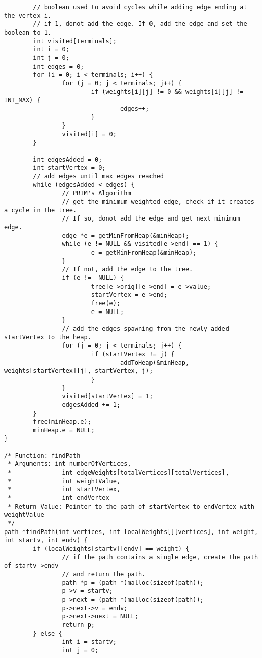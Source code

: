 \documentclass[a4paper]{article}
\begin{document}
\begin{lstlisting}
        // boolean used to avoid cycles while adding edge ending at the vertex i.
        // if 1, donot add the edge. If 0, add the edge and set the boolean to 1.
        int visited[terminals];
        int i = 0;
        int j = 0;
        int edges = 0;
        for (i = 0; i < terminals; i++) {
                for (j = 0; j < terminals; j++) {
                        if (weights[i][j] != 0 && weights[i][j] != INT_MAX) {
                                edges++;
                        }
                }
                visited[i] = 0;
        }

        int edgesAdded = 0;
        int startVertex = 0;
        // add edges until max edges reached
        while (edgesAdded < edges) {
                // PRIM's Algorithm
                // get the minimum weighted edge, check if it creates a cycle in the tree.
                // If so, donot add the edge and get next minimum edge.
                edge *e = getMinFromHeap(&minHeap);
                while (e != NULL && visited[e->end] == 1) {
                        e = getMinFromHeap(&minHeap);
                }
                // If not, add the edge to the tree.
                if (e !=  NULL) {
                        tree[e->orig][e->end] = e->value;
                        startVertex = e->end;
                        free(e);
                        e = NULL;
                }
                // add the edges spawning from the newly added startVertex to the heap.
                for (j = 0; j < terminals; j++) {
                        if (startVertex != j) {
                                addToHeap(&minHeap, weights[startVertex][j], startVertex, j);
                        }
                }
                visited[startVertex] = 1;
                edgesAdded += 1;
        }
        free(minHeap.e);
        minHeap.e = NULL;
}

/* Function: findPath
 * Arguments: int numberOfVertices,
 *              int edgeWeights[totalVertices][totalVertices],
 *              int weightValue,
 *              int startVertex,
 *              int endVertex
 * Return Value: Pointer to the path of startVertex to endVertex with weightValue
 */
path *findPath(int vertices, int localWeights[][vertices], int weight, int startv, int endv) {
        if (localWeights[startv][endv] == weight) {
                // if the path contains a single edge, create the path of startv->endv
                // and return the path.
                path *p = (path *)malloc(sizeof(path));
                p->v = startv;
                p->next = (path *)malloc(sizeof(path));
                p->next->v = endv;
                p->next->next = NULL;
                return p;
        } else {
                int i = startv;
                int j = 0;


\end{lstlisting}
\end{document}
